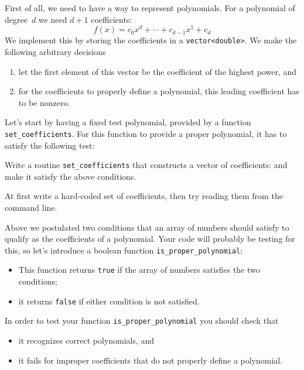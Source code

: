 First of all, we need to have a way to represent polynomials.
For a polynomial of degree~$d$ we need $d+1$ coefficients:
\begin{equation}
  f(x) = c_0 x^d + \cdots + c_{d-1} x^1 + c_d
  \label{eq:poly-coeff}
\end{equation}
We implement this by storing the coefficients in a
\lstinline+vector<double>+.
We make the following arbitrary decisions
\begin{enumerate}
\item let the first element
  of this vector be the coefficient of the highest power, and
\item 
  for the coefficients to properly define a polynomial,
  this leading coefficient has to be nonzero.
\end{enumerate}
Let's start by having a fixed test polynomial,
provided by a function \lstinline+set_coefficients+.
For this function to provide a proper polynomial,
it has to satisfy the following test:
%

\begin{exercise}
  \label{ex:bisect-coeff}
  Write a routine \lstinline+set_coefficients+ that constructs
  a vector of coefficients:
  and make it satisfy the above conditions.
  
  At first write a hard-coded set of coefficients,
  then try reading them from the command line.
\end{exercise}

Above we postulated two conditions that an array of numbers should satisfy
to qualify as the coefficients of a polynomial.
Your code will probably be testing for this,
so let's introduce a boolean function
\lstinline+is_proper_polynomial+:
\begin{itemize}
\item This function returns \lstinline{true} if the array of numbers satisfies
  the two conditions;
\item it returns \lstinline{false} if either condition is not satisfied.
\end{itemize}

In order to test your function \lstinline+is_proper_polynomial+ you should check that
\begin{itemize}
\item
  it recognizes correct polynomials, and
\item it fails for improper coefficients that do not properly define a polynomial.
\end{itemize}

